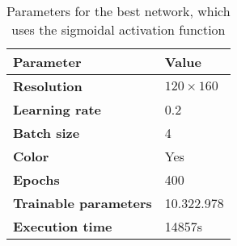 \begin{table}[h!]
	\footnotesize
	\centering
	\begin{tabular}{ll}
	\hline
		\textbf{Parameter} & \textbf{Value}\\
	\hline
	\hline
		\textbf{Resolution} & $120\times160$\\
		\textbf{Learning rate} & 0.2\\
		\textbf{Batch size} & 4\\
		\textbf{Color} & Yes\\
		\textbf{Epochs} & 400\\
		\textbf{Trainable parameters} & 10.322.978\\
		\textbf{Execution time} & 14857s\\
	\hline
	\end{tabular}
	\caption{Parameters for the best network, which uses the sigmoidal activation function}
	\label{tab:params_learningrates_network}
\end{table}
